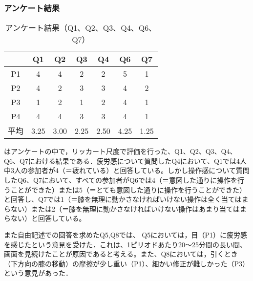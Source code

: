 \documentclass[submit, techrep]{ipsj}
\begin{document}


\subsubsection{アンケート結果}
\begin{table}[tb]
	\begin{center}
		\begin{tabular}{|c|c|c|c|c|c|c|}
		\hline
 & Q1 & Q2 & Q3 & Q4 & Q6 & Q7 \\ \hline
P1 & 4 & 4 & 2 & 2 & 5 & 1 \\ \hline
P2 & 4 & 2 & 3 & 3 & 4 & 2 \\ \hline
P3 & 1 & 2 & 1 & 2 & 4 & 1 \\ \hline
P4 & 4 & 4 & 3 & 3 & 4 & 1 \\ \hline
平均 & 3.25 & 3.00 & 2.25 & 2.50 & 4.25 & 1.25 \\ \hline
		\end{tabular}
	\end{center}
	\caption{アンケート結果（Q1、Q2、Q3、Q4、Q6、Q7）}
	\label{tb:enquette}
\end{table}
はアンケートの中で，リッカート尺度で評価を行った、Q1、Q2、Q3、Q4、Q6、Q7における結果である．疲労感について質問したQ4において、Q1では4人中3人の参加者が4（＝疲れている）と回答している。しかし操作感について質問したQ6、Q7において、すべての参加者がQ6では4（＝意図した通りに操作を行うことができた）または5（＝とても意図した通りに操作を行うことができた）と回答し、Q7では1（＝膝を無理に動かさなければいけない操作は全く当てはまらない）または2（＝膝を無理に動かさなければいけない操作はあまり当てはまらない）と回答している。\par
また自由記述での回答を求めたQ5,Q8では、
Q5においては，目（P1）に疲労感を感じたという意見を受けた．これは、1ピリオドあたり20〜25分間の長い間、画面を見続けたことが原因であると考える。また、Q8においては，引くとき（下方向の膝の移動）の摩擦が少し重い（P1）、細かい修正が難しかった（P3）という意見があった．
\end{document}
